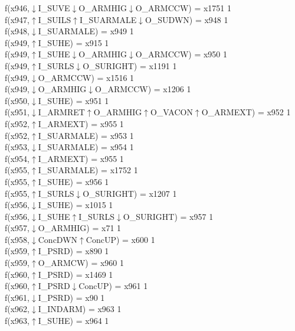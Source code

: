 f(x946,$\downarrow$I\_SUVE$\downarrow$O\_ARMHIG$\downarrow$O\_ARMCCW) = x1751 {1} \\
f(x947,$\uparrow$I\_SUILS$\uparrow$I\_SUARMALE$\downarrow$O\_SUDWN) = x948 {1} \\
f(x948,$\downarrow$I\_SUARMALE) = x949 {1} \\
f(x949,$\uparrow$I\_SUHE) = x915 {1} \\
f(x949,$\uparrow$I\_SUHE$\downarrow$O\_ARMHIG$\downarrow$O\_ARMCCW) = x950 {1} \\
f(x949,$\uparrow$I\_SURLS$\downarrow$O\_SURIGHT) = x1191 {1} \\
f(x949,$\downarrow$O\_ARMCCW) = x1516 {1} \\
f(x949,$\downarrow$O\_ARMHIG$\downarrow$O\_ARMCCW) = x1206 {1} \\
f(x950,$\downarrow$I\_SUHE) = x951 {1} \\
f(x951,$\downarrow$I\_ARMRET$\uparrow$O\_ARMHIG$\uparrow$O\_VACON$\uparrow$O\_ARMEXT) = x952 {1} \\
f(x952,$\uparrow$I\_ARMEXT) = x955 {1} \\
f(x952,$\uparrow$I\_SUARMALE) = x953 {1} \\
f(x953,$\downarrow$I\_SUARMALE) = x954 {1} \\
f(x954,$\uparrow$I\_ARMEXT) = x955 {1} \\
f(x955,$\uparrow$I\_SUARMALE) = x1752 {1} \\
f(x955,$\uparrow$I\_SUHE) = x956 {1} \\
f(x955,$\uparrow$I\_SURLS$\downarrow$O\_SURIGHT) = x1207 {1} \\
f(x956,$\downarrow$I\_SUHE) = x1015 {1} \\
f(x956,$\downarrow$I\_SUHE$\uparrow$I\_SURLS$\downarrow$O\_SURIGHT) = x957 {1} \\
f(x957,$\downarrow$O\_ARMHIG) = x71 {1} \\
f(x958,$\downarrow$ConcDWN$\uparrow$ConcUP) = x600 {1} \\
f(x959,$\uparrow$I\_PSRD) = x890 {1} \\
f(x959,$\uparrow$O\_ARMCW) = x960 {1} \\
f(x960,$\uparrow$I\_PSRD) = x1469 {1} \\
f(x960,$\uparrow$I\_PSRD$\downarrow$ConcUP) = x961 {1} \\
f(x961,$\downarrow$I\_PSRD) = x90 {1} \\
f(x962,$\downarrow$I\_INDARM) = x963 {1} \\
f(x963,$\uparrow$I\_SUHE) = x964 {1} \\
